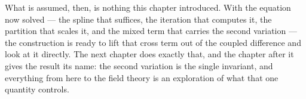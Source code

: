 What is assumed, then, is nothing this chapter introduced. With the equation now solved --- the spline
that suffices, the iteration that computes it, the partition that scales it, and the mixed term that
carries the second variation --- the construction is ready to lift that cross term out of the coupled
difference and look at it directly. The next chapter does exactly that, and the chapter after it gives
the result its name: the second variation is the single invariant, and everything from here to the
field theory is an exploration of what that one quantity controls.
